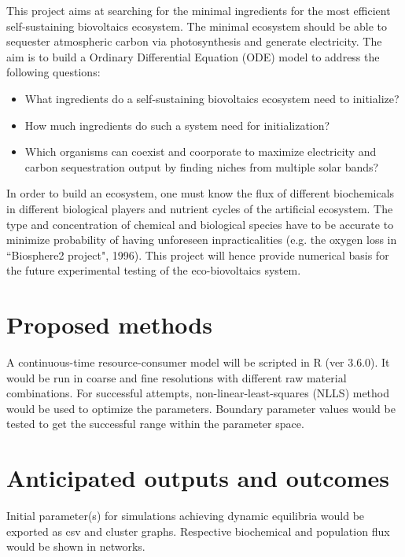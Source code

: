 \documentclass[a4paper, 11pt]{article}
\begin{document}
This project aims at searching for the minimal ingredients for the most efficient self-sustaining biovoltaics ecosystem.  The minimal ecosystem should be able to sequester atmospheric carbon via photosynthesis and generate electricity.  The aim is to build a Ordinary Differential Equation (ODE) model to address the following questions:
\begin{itemize}
	\item What ingredients do a self-sustaining biovoltaics ecosystem need to initialize?
	\item How much ingredients do such a system need for initialization?
	\item Which organisms can coexist and coorporate to maximize electricity and carbon sequestration output by finding niches from multiple solar bands?
\end{itemize}

In order to build an ecosystem, one must know the flux of different biochemicals in different biological players and nutrient cycles of the artificial ecosystem.  The type and concentration of chemical and biological species have to be accurate to minimize probability of having unforeseen inpracticalities (e.g. the oxygen loss in ``Biosphere2 project", 1996).  This project will hence provide numerical basis for the future experimental testing of the eco-biovoltaics system.

\section{Proposed methods}
A continuous-time resource-consumer model will be scripted in R (ver 3.6.0).  It would be run in coarse and fine resolutions with different raw material combinations.  For successful attempts, non-linear-least-squares (NLLS) method would be used to optimize the parameters.  Boundary parameter values would be tested to get the successful range within the parameter space.
\section{Anticipated outputs and outcomes}
Initial parameter(s) for simulations achieving dynamic equilibria would be exported as csv and cluster graphs.  Respective biochemical and population flux would be shown in networks.
\end{document}
